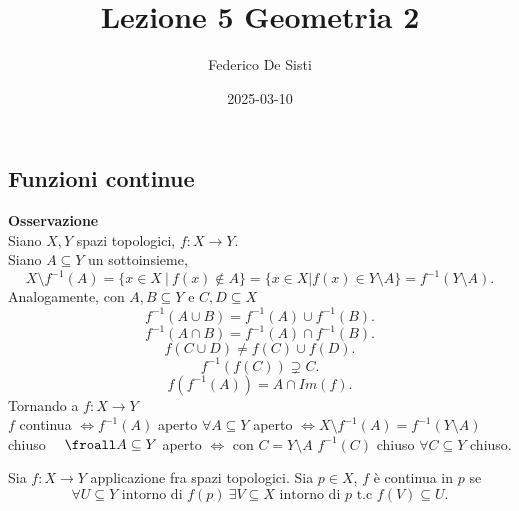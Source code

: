 \documentclass[12px]{article}
\title{Lezione 5 Geometria 2}
\date{2025-03-10}
\author{Federico De Sisti}
\begin{document}
	\maketitle
	\newpage
	\subsection{Funzioni continue}
	\textbf{Osservazione}\\
	Siano $X,Y$ spazi topologici, $f: X \rightarrow Y$.\\
	Siano $A\subseteq Y$ un sottoinsieme,
	 \[
		 X\setminus f^{-1}(A) = \{x\in X \ | \ f(x)\not\in A\} = \{x\in X | f(x) \in Y\setminus A\} = f^{-1}(Y\setminus A)
	.\] 
	Analogamente, con $A,B\subseteq Y$ e $C,D\subseteq X$
	\[
	 f^{-1}(A\cup B) = f^{-1}(A)\cup f^{-1}(B)
	.\] 
	\[
	f^{-1}(A\cap B) = f^{-1}(A)\cap f^{-1}(B)
	.\] 
	\[
	 f(C\cup D) \neq f(C)\cup f(D)
	.\] 
	\[
	 f^{-1}(f(C))\supsetneq C
	.\] 
	\[
	 f(f^{-1}(A)) = A\cap Im(f)
	.\] 
	Tornando a $f: X \rightarrow Y$\\
	$f$ continua $ \Leftrightarrow f^{-1}(A)$ aperto $\forall A\subseteq Y$ aperto $ \Leftrightarrow X\setminus f^{-1}(A) = f^{-1}(Y\setminus A) $ chiuso \ \ $\froall A\subseteq Y$ aperto $ \Leftrightarrow$ con $C = Y\setminus A$ $f^{-1}(C)$ chiuso $\forall C\subseteq Y$ chiuso.
	\begin{defi}[Continuità]
		Sia $f:X \rightarrow Y$ applicazione fra spazi topologici. Sia $p\in X$,  $f$ è continua in $p$ se
		\[
			\forall U\subseteq Y\text{ intorno di } f(p) \ \exists V\subseteq X \text{ intorno di } p \text{ t.c } f(V)\subseteq U
		.\] 
	\end{defi}
\end{document}
